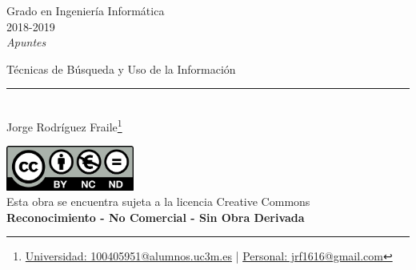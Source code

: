 \documentclass[12pt]{report} %
\begin{document}
	
\begin{titlepage}
	\begin{sffamily}
	\color{azulUC3M}
	\begin{center}
		\begin{figure}[H] %
		\end{figure}
		\vspace{2.5cm}
		\begin{Large}
			Grado en Ingeniería Informática\\			
			2018-2019\\
			\vspace{2cm}		
			\textsl{Apuntes}\\
			\bigskip
		\end{Large}
		 	{\Huge Técnicas de Búsqueda y Uso de la Información}\\
		 	\vspace*{0.5cm}
	 		\rule{10.5cm}{0.1mm}\\
			\vspace*{0.9cm}
			{\LARGE Jorge Rodríguez Fraile\footnote{\href{mailto:100405951@alumnos.uc3m.es}{Universidad: 100405951@alumnos.uc3m.es}  |  \href{mailto:jrf1616@gmail.com}{Personal: jrf1616@gmail.com}}}\\ 
			\vspace*{1cm}
	\end{center}
	\vfill
	\color{black}
		\includegraphics[width=4.2cm]{img/creativecommons.png}\\
		Esta obra se encuentra sujeta a la licencia Creative Commons\\ \textbf{Reconocimiento - No Comercial - Sin Obra Derivada}
	\end{sffamily}
\end{titlepage}


\tableofcontents
\thispagestyle{fancy}
\end{document}
